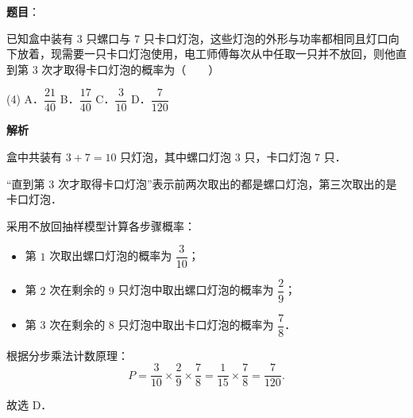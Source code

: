 \begin{answer}

\textbf{题目}：

已知盒中装有 $3$ 只螺口与 $7$ 只卡口灯泡，这些灯泡的外形与功率都相同且灯口向下放着，现需要一只卡口灯泡使用，电工师傅每次从中任取一只并不放回，则他直到第 $3$ 次才取得卡口灯泡的概率为\mbox{（　　）}

\begin{gkopts}(4)
\task A．$\dfrac{21}{40}$
\task B．$\dfrac{17}{40}$
\task C．$\dfrac{3}{10}$
\task D．$\dfrac{7}{120}$
\end{gkopts}

\textbf{解析}

盒中共装有 $3 + 7 = 10$ 只灯泡，其中螺口灯泡 $3$ 只，卡口灯泡 $7$ 只．

“直到第 $3$ 次才取得卡口灯泡”表示前两次取出的都是螺口灯泡，第三次取出的是卡口灯泡．

采用不放回抽样模型计算各步骤概率：
\begin{itemize}
\item 第 $1$ 次取出螺口灯泡的概率为 $\dfrac{3}{10}$；
\item 第 $2$ 次在剩余的 $9$ 只灯泡中取出螺口灯泡的概率为 $\dfrac{2}{9}$；
\item 第 $3$ 次在剩余的 $8$ 只灯泡中取出卡口灯泡的概率为 $\dfrac{7}{8}$．
\end{itemize}

根据分步乘法计数原理：
\nopagebreak[4]
\[
P = \frac{3}{10} \times \frac{2}{9} \times \frac{7}{8} = \frac{1}{15} \times \frac{7}{8} = \frac{7}{120}.
\]

故选 D．


\end{answer}
